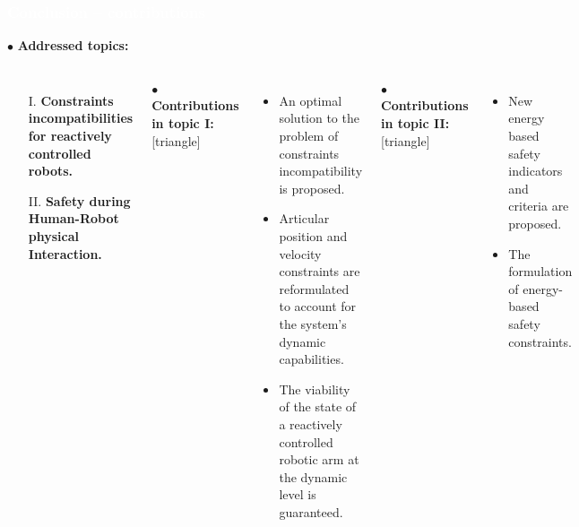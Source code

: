 \begin{frame}[noframenumbering]
\frametitle{{\textcolor{white}{\hspace{0.3cm}Conclusion -- contributions}}}


\hspace{-6mm}
$\bullet$ {\color{blue-violet}\textbf{Addressed topics:}}
\begin{columns}
\column{\paperwidth-10mm}
\begin{itemize}
\item[I.]  {\color{red}\textbf{Constraints incompatibilities for reactively controlled robots.}}
\item[II.] {\color{red}\textbf{Safety during Human-Robot physical Interaction.}}
\end{itemize}
\vspace{5mm}

$\bullet$ {\color{ao(english)}\textbf{Contributions in topic I:}}
[triangle] 
\begin{itemize}
\item An optimal solution to the problem of constraints incompatibility is proposed.

\item Articular position and velocity constraints are reformulated to account for the system's dynamic capabilities.

\item The viability of the state of a reactively controlled robotic arm at the dynamic level is guaranteed.

\end{itemize}
\vspace{5mm}

$\bullet$ {\color{ao(english)}\textbf{Contributions in topic II:}}
[triangle] 
\begin{itemize}
\item New energy based safety indicators and criteria are proposed.

\item The formulation of energy-based safety constraints.

\end{itemize}
\end{columns}
\end{frame}




